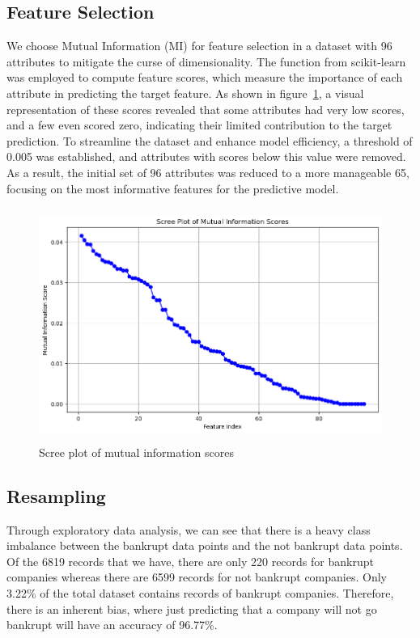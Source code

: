 \documentclass{article}
\newcommand{\ttt}[1]{%
  \begingroup
    \protect\renewcommand{\seqinsert}{\ifmmode\allowbreak\else\-\fi}%
    \protect\texttt{\protect\seqinsert{\protect\seqsplit{\small#1}}}%
  \endgroup
}
\begin{document}
\subsection{Feature Selection}
\label{ssec:feature-selection}

We choose Mutual Information (MI) for feature selection in a dataset with 96 attributes to mitigate the curse of dimensionality. 
The \ttt{mutual\_info\_classif} function from scikit-learn was employed to compute feature scores, which measure the importance of each attribute in predicting the target feature. 
As shown in figure~\ref{fig:scree-plot}, a visual representation of these scores revealed that some attributes had very low scores, and a few even scored zero, indicating their limited contribution to the target prediction. 
To streamline the dataset and enhance model efficiency, a threshold of 0.005 was established, and attributes with scores below this value were removed. 
As a result, the initial set of 96 attributes was reduced to a more manageable 65, focusing on the most informative features for the predictive model.

\begin{figure}
  \centering
  \includegraphics[height=3in]{figures/feature_scores.png}
  \caption{Scree plot of mutual information scores}
  \label{fig:scree-plot}
\end{figure}

\subsection{Resampling}
\label{ssec:resampling}

Through exploratory data analysis, we can see that there is a heavy class imbalance between the bankrupt data points and the not bankrupt data points. 
Of the 6819 records that we have, there are only 220 records for bankrupt companies whereas there are 6599 records for not bankrupt companies. 
Only 3.22\% of the total dataset contains records of bankrupt companies. 
Therefore, there is an inherent bias, where just predicting that a company will not go bankrupt will have an accuracy of 96.77\%.
\end{document}
